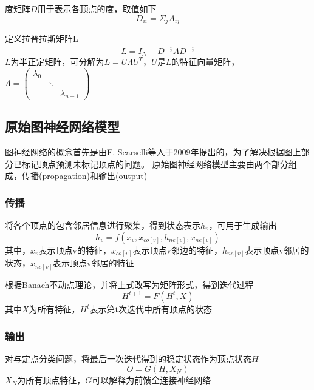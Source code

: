 \begin{definition}
    度矩阵$D$用于表示各顶点的度，取值如下
    \begin{equation}
        D_{ii}=\Sigma _jA_{ij}
    \end{equation}
\end{definition}

\begin{definition}
    定义拉普拉斯矩阵L
    \begin{equation}
        L=I_N-D^{-\frac{1}{2}}AD^{-\frac{1}{2}}
    \end{equation}
    $L$为半正定矩阵，可分解为$L=U\Lambda U^{T}$，$U$是$L$的特征向量矩阵，$\Lambda=\left(\begin{array}{ccc}
        \lambda_{0} & & \\
        & \ddots & \\
        & & \lambda_{n-1}
        \end{array}\right)$
\end{definition}

\subsection{原始图神经网络模型}

图神经网络的概念首先是由F. Scarselli等人于2009年提出的，为了解决根据图上部分已标记顶点预测未标记顶点的问题。
原始图神经网络模型主要由两个部分组成，传播(propagation)和输出(output)

\subsubsection{传播}
将各个顶点的包含邻居信息进行聚集，得到状态表示$h_v$，可用于生成输出
\begin{equation}
    h_v=f(x_v,x_{co[v]},h_{ne[v]},x_{ne[v]})
\end{equation}
其中，$x_v$表示顶点v的特征，$x_{co[v]}$表示顶点v邻边的特征，$h_{ne[v]}$表示顶点v邻居的状态，$x_{ne[v]}$表示顶点v邻居的特征

根据Banach不动点理论，并将上式改写为矩阵形式，得到迭代过程
\begin{equation}
    H^{t+1}=F(H^t,X)
\end{equation}
其中$X$为所有特征，$H^t$表示第t次迭代中所有顶点的状态

\subsubsection{输出}
对与定点分类问题，将最后一次迭代得到的稳定状态作为顶点状态$H$
\begin{equation}
    O=G(H,X_N)
\end{equation}
$X_N$为所有顶点特征，$G$可以解释为前馈全连接神经网络


